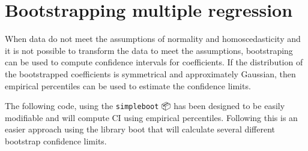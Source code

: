 \documentclass[
  12pt,
]{book}
\newenvironment{Shaded}{\begin{snugshade}}{\end{snugshade}}
\newcommand{\CommentTok}[1]{\textcolor[rgb]{0.56,0.35,0.01}{\textit{#1}}}
\newcommand{\ControlFlowTok}[1]{\textcolor[rgb]{0.13,0.29,0.53}{\textbf{#1}}}
\newcommand{\DataTypeTok}[1]{\textcolor[rgb]{0.13,0.29,0.53}{#1}}
\newcommand{\DecValTok}[1]{\textcolor[rgb]{0.00,0.00,0.81}{#1}}
\newcommand{\KeywordTok}[1]{\textcolor[rgb]{0.13,0.29,0.53}{\textbf{#1}}}
\newcommand{\NormalTok}[1]{#1}
\newcommand{\OperatorTok}[1]{\textcolor[rgb]{0.81,0.36,0.00}{\textbf{#1}}}
\newcommand{\OtherTok}[1]{\textcolor[rgb]{0.56,0.35,0.01}{#1}}
\newcommand{\StringTok}[1]{\textcolor[rgb]{0.31,0.60,0.02}{#1}}
\begin{document}
\hypertarget{bootstrapping-multiple-regression}{%
\section{Bootstrapping multiple regression}\label{bootstrapping-multiple-regression}}

When data do not meet the assumptions of normality and homoscedasticity and it is not possible to transform the data to meet the assumptions, bootstraping can be used to compute confidence intervals for coefficients. If the distribution of the bootstrapped coefficients is symmetrical and approximately Gaussian, then empirical percentiles can be used to estimate the confidence limits.

The following code, using the \texttt{simpleboot} 📦 has been designed to be easily modifiable and will compute CI using empirical percentiles. Following this is an easier approach using the library boot that will calculate several different bootstrap confidence limits.

\begin{Shaded}
\end{Shaded}
\end{document}
